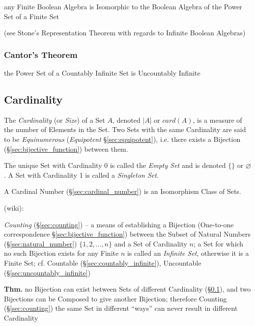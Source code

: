 any Finite Boolean Algebra is Isomorphic to the Boolean Algebra of the Power Set
of a Finite Set

(see Stone's Representation Theorem with regards to Infinite Boolean Algebras)



\subsubsection{Cantor's Theorem}\label{sec:cantors_theorem}

the Power Set of a Countably Infinite Set is Uncountably Infinite



\subsection{Cardinality}\label{sec:cardinality}

The \emph{Cardinality} (or \emph{Size}) of a Set $A$, denoted $|A|$ or
$card(A)$, is a measure of the number of Elements in the Set. Two Sets with the
same Cardinality are said to be \emph{Equinumerous} (\emph{Equipotent}
\S\ref{sec:equipotent}), i.e. there exists a Bijection
(\S\ref{sec:bijective_function}) between them.

The unique Set with Cardinality 0 is called the \emph{Empty Set} and is denoted
$\{\}$ or $\varnothing$. A Set with Cardinality 1 is called a \emph{Singleton
  Set}.

A Cardinal Number (\S\ref{sec:cardinal_number}) is an Isomorphism Class of Sets.

(wiki):

\emph{Counting} (\S\ref{sec:counting}) -- a means of establishing a Bijection
(One-to-one correspondence \S\ref{sec:bijective_function}) between the Subset of
Natural Numbers (\S\ref{sec:natural_number}) $\{1,2,\ldots,n\}$ and a Set of
Cardinality $n$; a Set for which no such Bijection exists for any Finite $n$ is
called an \emph{Infinite Set}, otherwise it is a Finite Set;
cf. Countable (\S\ref{sec:countably_infinite}), Uncountable
(\S\ref{sec:uncountably_infinite})

\textbf{Thm.} no Bijection can exist between Sets of different
Cardinality (\S\ref{sec:cardinality}), and two Bijections can be Composed to
give another Bijection; therefore Counting (\S\ref{sec:counting}) the same Set
in different ``ways'' can never result in different Cardinality

